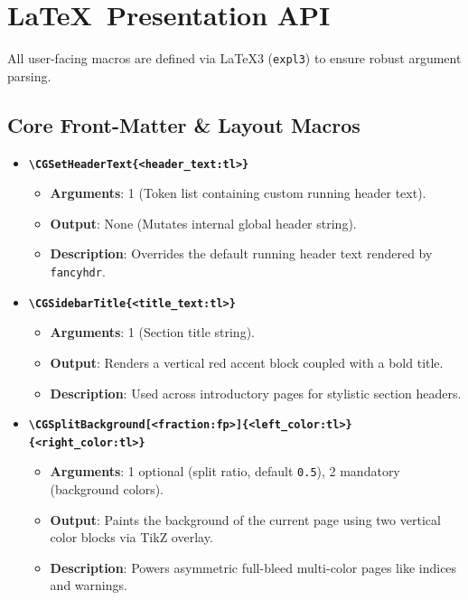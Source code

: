 \section{\LaTeX\ Presentation API}

All user-facing macros are defined via \LaTeX3 (\texttt{expl3}) to ensure robust argument parsing.

\subsection{Core Front-Matter \& Layout Macros}

\begin{itemize}
    \item \textbf{\texttt{\textbackslash CGSetHeaderText\{<header\_text:tl>\}}}
    \begin{itemize}
        \item \textbf{Arguments}: 1 (Token list containing custom running header text).
        \item \textbf{Output}: None (Mutates internal global header string).
        \item \textbf{Description}: Overrides the default running header text rendered by \texttt{fancyhdr}.
    \end{itemize}

    \item \textbf{\texttt{\textbackslash CGSidebarTitle\{<title\_text:tl>\}}}
    \begin{itemize}
        \item \textbf{Arguments}: 1 (Section title string).
        \item \textbf{Output}: Renders a vertical red accent block coupled with a bold title.
        \item \textbf{Description}: Used across introductory pages for stylistic section headers.
    \end{itemize}

    \item \textbf{\texttt{\textbackslash CGSplitBackground[<fraction:fp>]\{<left\_color:tl>\}\{<right\_color:tl>\}}}
    \begin{itemize}
        \item \textbf{Arguments}: 1 optional (split ratio, default \texttt{0.5}), 2 mandatory (background colors).
        \item \textbf{Output}: Paints the background of the current page using two vertical color blocks via TikZ overlay.
        \item \textbf{Description}: Powers asymmetric full-bleed multi-color pages like indices and warnings.
    \end{itemize}


\end{itemize}
